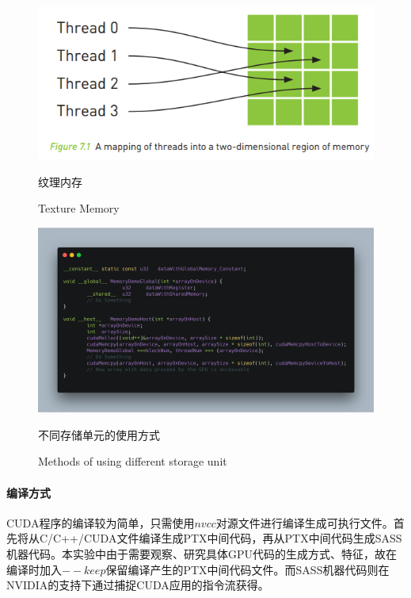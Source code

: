\begin{figure}
	\centering
	\includegraphics[width=15cm]{figures/Fig1.jpg}
	\renewcommand{\thefigure}{\arabic{section}-\arabic{figure} }
	\renewcommand{\figurename}{图}
	\caption{纹理内存}
	\addtocounter{figure}{-1}
	\renewcommand{\thefigure}{\arabic{section}-\arabic{figure} }
	\renewcommand{\figurename}{Figure}
	\caption{Texture Memory}
	\label{Fig.1}
\end{figure}
\begin{figure}
	\centering
	\includegraphics[width=15cm]{figures/CODE2.png}
	\renewcommand{\thefigure}{\arabic{section}-\arabic{figure} }
	\renewcommand{\figurename}{图}
	\caption{不同存储单元的使用方式}
	\addtocounter{figure}{-1}
	\renewcommand{\thefigure}{\arabic{section}-\arabic{figure} }
	\renewcommand{\figurename}{Figure}
	\caption{Methods of using different storage unit}
	\label{Fig.3}
\end{figure}
\paragraph{编译方式}
\par CUDA程序的编译较为简单，只需使用$ nvcc $对源文件进行编译生成可执行文件。首先将从C/C++/CUDA文件编译生成PTX中间代码，再从PTX中间代码生成SASS机器代码。本实验中由于需要观察、研究具体GPU代码的生成方式、特征，故在编译时加入$ --keep $保留编译产生的PTX中间代码文件。而SASS机器代码则在NVIDIA的支持下通过捕捉CUDA应用的指令流获得。
